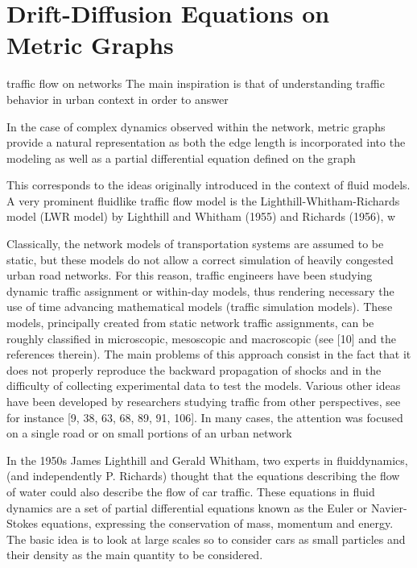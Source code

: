 \section{Drift-Diffusion Equations on Metric Graphs}
\label{ch1:sec2}

traffic flow on networks The main inspiration is that of understanding traffic behavior in urban context in order to answer

In the case of complex dynamics observed within the network, metric graphs provide a natural representation as both the edge length is incorporated into the modeling as well as a partial differential equation defined on the graph

This corresponds to the ideas originally introduced in the context of fluid models. A very prominent fluidlike traffic flow model is the Lighthill-Whitham-Richards model (LWR model) by Lighthill and Whitham (1955) and Richards (1956), w

Classically, the network models of transportation systems are assumed to be static, but these models do not allow a correct simulation of heavily congested urban road networks. For this reason, traffic engineers have been studying dynamic traffic assignment or within-day models, thus rendering necessary the use of time advancing mathematical models (traffic simulation models). These models, principally created from static network traffic assignments, can be roughly classified in microscopic, mesoscopic and macroscopic (see [10] and the references therein). The main problems of this approach consist in the fact that it does not properly reproduce the backward propagation of shocks and in the difficulty of collecting experimental data to test the models. Various other ideas have been developed by researchers studying traffic from other perspectives, see for instance [9, 38, 63, 68, 89, 91, 106]. In many cases, the attention was focused on a single road or on small portions of an urban network

In the 1950s James Lighthill and Gerald Whitham, two experts in fluiddynamics, (and independently P. Richards) thought that the equations describing the flow of water could also describe the flow of car traffic. These equations in fluid dynamics are a set of partial differential equations known as the Euler or Navier-Stokes equations, expressing the conservation of mass, momentum and energy. The basic idea is to look at large scales so to consider cars as small particles and their density as the main quantity to be considered.



